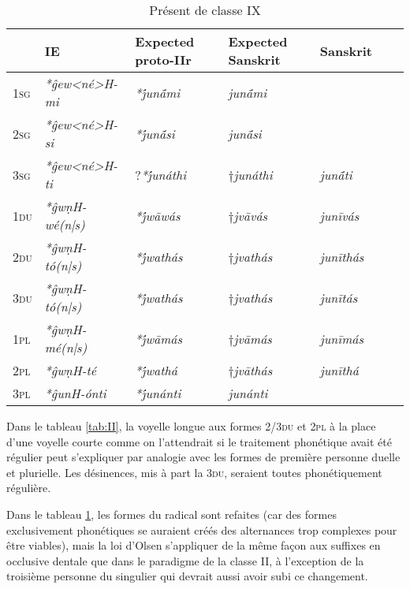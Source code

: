 \documentclass[oldfontcommands,oneside,a4paper,11pt]{article}
\newcommand{\ipa}[1]{{\phon\textit{#1}}} %
\newcommand{\grise}[1]{\cellcolor{lightgray}\textbf{#1}}
\begin{document}
\begin{table}[H]
\caption{Présent de classe IX} \label{tab:IX}
\begin{tabular}{lllllll}
\toprule
 & 	IE  & 	Expected proto-IIr & 	Expected Sanskrit & 	Sanskrit   	\\
\midrule
\textsc{1sg} & 	\ipa{*ĝew<né>H-mi} & 	\ipa{*j́unā́mi} & 	\ipa{junā́mi} & 	  & 	\\
\textsc{2sg} & 	\ipa{*ĝew<né>H-si} & 	\ipa{*j́unā́si} & 	\ipa{junā́si} & 	 & 	\\
\textsc{3sg} & 	\ipa{*ĝew<né>H-ti} & 	?\ipa{*j́unáthi} \grise{}& 	$\dagger$\ipa{junáthi} \grise{}& \ipa{junā́ti}  & 	\\
\textsc{1du} & 	\ipa{*ĝwṇH-wé(n|s)}   & 	\ipa{*j́wāwás} \grise{} &$\dagger$\ipa{jvāvás}\grise{}& 	 \ipa{junīvás}    	   & 	\\
\textsc{2du} & 	\ipa{*ĝwṇH-tó(n|s)} & 	\ipa{*j́wathás} \grise{}& 	$\dagger$\ipa{jvathás} \grise{}& 	\ipa{junīthás} & 	\\
\textsc{3du} & 	\ipa{*ĝwṇH-tó(n|s)} & 	\ipa{*j́wathás}  \grise{} & $\dagger$\ipa{jvathás} \grise{} & 	\ipa{junītás} & 	\\
\textsc{1pl} & 	\ipa{*ĝwṇH-mé(n|s)} & 	\ipa{*j́wāmás}  \grise{}& 	$\dagger$\ipa{jvāmás} \grise{} & 	   	\ipa{junīmás} \\
\textsc{2pl} & 	\ipa{*ĝwṇH-té} & 	\ipa{*j́wathá}  \grise{}& 	$\dagger$\ipa{jvāthás}  \grise{}& 	\ipa{junīthá} &  	\\
\textsc{3pl} & 	\ipa{*ĝunH-ónti} & 	\ipa{*j́unánti} & 	\ipa{junánti} &  & 	\\
\bottomrule
\end{tabular}
\end{table}


Dans le tableau \ref{tab:II}, la voyelle longue aux formes \textsc{2/3du} et \textsc{2pl} à la place d'une voyelle courte comme on l'attendrait si le traitement phonétique avait été régulier peut s'expliquer par analogie avec les formes de première personne duelle et plurielle. Les désinences, mis à part la \textsc{3du}, seraient toutes phonétiquement régulière.

Dans le tableau \ref{tab:IX}, les formes du radical sont refaites (car des formes exclusivement phonétiques se auraient créés des alternances trop complexes pour être viables), mais la loi d'Olsen s'appliquer de la même façon aux suffixes en occlusive dentale que dans le paradigme de la classe II, à l'exception de la troisième personne du singulier qui devrait aussi avoir subi ce changement.
\end{document}
